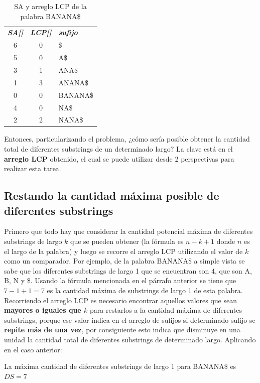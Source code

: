 \begin{table}[H]
	\centering
	\label{propuesta-1}
	\begin{tabular}{c c l}
		\textit{\textbf{SA[]}} & \textit{\textbf{LCP[]}} &\textit{\textbf{sufijo}}\\
		6 & 0 & \$\\
		5 & 0 & A\$\\
		3 & 1 & ANA\$\\
		1 & 3 & ANANA\$\\
		0 & 0 & BANANA\$\\
		4 & 0 & NA\$\\
		2 & 2 & NANA\$\\
	\end{tabular}
\caption{SA y arreglo LCP de la palabra BANANA\$}
\end{table}

Entonces, particularizando el problema, ¿cómo sería posible obtener la cantidad total de diferentes substrings de un determinado largo? La clave está en el \textbf{arreglo LCP} obtenido, el cual se puede utilizar desde 2 perspectivas para realizar esta tarea.

\subsection{Restando la cantidad máxima posible de diferentes substrings}

Primero que todo hay que considerar la cantidad potencial máxima de diferentes substrings de largo $k$ que se pueden obtener (la fórmula es $n-k+1$ donde $n$ es el largo de la palabra) y luego se recorre el arreglo LCP utilizando el valor de $k$ como un comparador.
Por ejemplo, de la palabra BANANA\$ a simple vista se sabe que los diferentes substrings de largo 1 que se encuentran son 4, que son A, B, N y \$. Usando la fórmula mencionada en el párrafo anterior se tiene que $7-1+1=7$ es la cantidad máxima de substrings de largo 1 de esta palabra. Recorriendo el arreglo LCP es necesario encontrar aquellos valores que sean \textbf{mayores o iguales que $k$} para restarlos a la cantidad máxima de diferentes substrings, porque ese valor indica en el arreglo de sufijos si determinado sufijo se \textbf{repite más de una vez}, por consiguiente esto indica que disminuye en una unidad la cantidad total de diferentes substrings de determinado largo. Aplicando en el caso anterior:

La máxima cantidad de diferentes substrings de largo 1 para BANANA\$ es $DS = 7$

